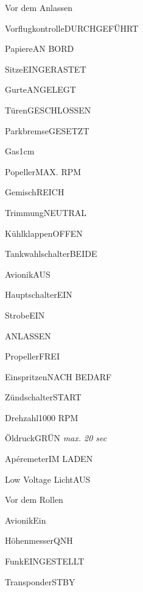 
\usepackage{wasysym}

\newcommand{\beat}[1]{\quarternote=#1}




\begin{task}
  \begin{checklist}{Vor dem Anlassen}
    \item{Vorflugkontrolle}{DURCHGEFÜHRT}
    \item{Papiere}{AN BORD}
    \item{Sitze}{EINGERASTET}
    \item{Gurte}{ANGELEGT}
    \item{Türen}{GESCHLOSSEN}
    \item{Parkbremse}{GESETZT}
    \item{Gas}{1cm}
    \item{Popeller}{MAX. RPM}
    \item{Gemisch}{REICH}
    \item{Trimmung}{NEUTRAL}
    \item{Kühlklappen}{OFFEN}
    \item{Tankwahlschalter}{BEIDE}
    \item{Avionik}{AUS}
    \item{Hauptschalter}{EIN}
    \item{Strobe}{EIN}
  \end{checklist}
\end{task}

\begin{task}
  \begin{checklist}{ANLASSEN}
    \item{Propeller}{FREI}
    \item{Einspritzen}{NACH BEDARF}
    \item{Zündschalter}{START}
    \item{Drehzahl}{1000 RPM}
    \item{Öldruck}{GRÜN \textit{max. 20 sec}}
    \item{Apéremeter}{IM LADEN}
    \item{Low Voltage Licht}{AUS}
  \end{checklist}
\end{task}

\begin{task}
  \begin{checklist}{Vor dem Rollen}
    \item{Avionik}{Ein}
    \item{Höhenmesser}{QNH}
    \item{Funk}{EINGESTELLT}
    \item{Transponder}{STBY}
  \end{checklist}
\end{task}

